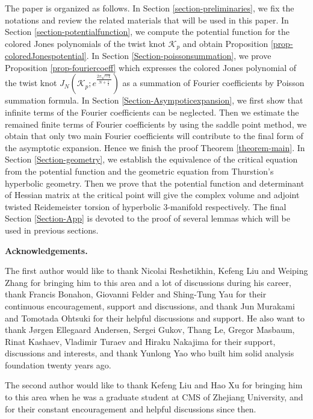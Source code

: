 \documentclass[12pt]{amsart}
\begin{document}
The paper is organized as follows. In Section \ref{section-preliminaries}, we fix the notations and review the related materials that will be used in this paper. In Section \ref{section-potentialfunction}, we compute the potential function for the colored Jones polynomials of the twist knot $\mathcal{K}_p$ and obtain Proposition \ref{prop-coloredJonespotential}. In Section  \ref{Section-poissonsummation}, we prove Proposition \ref{prop-fouriercoeff}  which expresses the colored Jones polynomial of the twist knot 
$J_N(\mathcal{K}_p;e^{\frac{2\pi\sqrt{-1}}{N+\frac{1}{2}}})$  as a summation of Fourier coefficients by Poisson summation formula.
In Section \ref{Section-Asympoticexpansion}, 
we first show that infinite terms of the Fourier coefficients can be neglected. Then we estimate the remained finite terms of Fourier coefficients by using the saddle point method, we obtain that only two main Fourier coefficients will contribute to the final form of the  asymptotic expansion.  Hence we finish the proof Theorem  \ref{theorem-main}.  In Section \ref{Section-geometry}, we establish the equivalence of the critical equation from the potential function and the geometric equation from Thurstion's hyperbolic geometry. Then we prove that the potential function and determinant of Hessian matrix at the critical point will give the complex volume and adjoint twisted Reidemeister torsion of hyperbolic 3-manifold respectively.   The final  Section \ref{Section-App} is devoted to the proof of several lemmas which will be used in previous sections.


\textbf{Acknowledgements.} 

The first author would like to thank Nicolai Reshetikhin, Kefeng Liu and Weiping Zhang for bringing him to this area and a lot of discussions during his career, thank Francis Bonahon,   Giovanni Felder and Shing-Tung Yau for their continuous encouragement, support and discussions, and thank Jun Murakami and Tomotada Ohtsuki for their helpful discussions and support. He also want to thank Jørgen Ellegaard Andersen, Sergei Gukov, Thang Le, Gregor Masbaum,  Rinat Kashaev, Vladimir Turaev and Hiraku Nakajima for their support, discussions and interests, and thank Yunlong Yao who built him solid analysis foundation twenty years ago.

  

 
The second author would like to thank Kefeng Liu and Hao Xu for bringing him to this area when he was a graduate student at CMS of Zhejiang University, and for their constant encouragement and helpful discussions since then.
\end{document}
